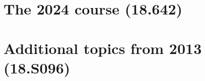 \documentclass[11pt,oneside,openany]{book}
\begin{document}
\part{The 2024 course (18.642)}\label{part:2024}



















\part{Additional topics from 2013 (18.S096)}\label{part:2013}








\appendix



\end{document}
